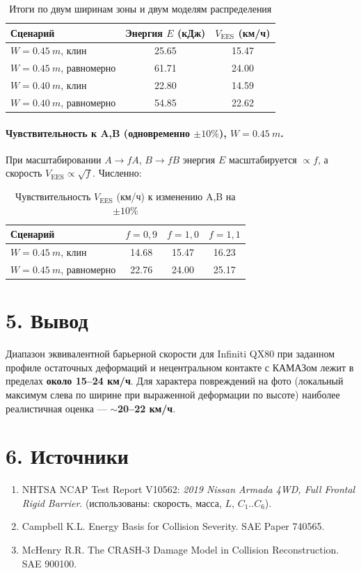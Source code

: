 \documentclass[12pt,a4paper]{article}
\begin{document}
	\begin{table}[h]
		\centering\small
		\caption{Итоги по двум ширинам зоны и двум моделям распределения}
		\begin{tabular}{lcc}
			\toprule
			Сценарий & Энергия $E$ (кДж) & $V_{\text{EES}}$ (км/ч)\\
			\midrule
			$W=\SI{0.45}{m}$, клин & 25.65 & 15.47\\
			$W=\SI{0.45}{m}$, равномерно & 61.71 & 24.00\\
			$W=\SI{0.40}{m}$, клин & 22.80 & 14.59\\
			$W=\SI{0.40}{m}$, равномерно & 54.85 & 22.62\\
			\bottomrule
		\end{tabular}
	\end{table}
	
	\paragraph{Чувствительность к A,B (одновременно $\pm10\%$), $W=\SI{0.45}{m}$.}
	При масштабировании $A\!\to\!fA$, $B\!\to\!fB$ энергия $E$ масштабируется $\propto f$, а скорость $V_{\text{EES}}\propto\sqrt{f}$. Численно:
	
	\begin{table}[h]
		\centering\small
		\caption{Чувствительность $V_{\text{EES}}$ (км/ч) к изменению A,B на $\pm10\%$}
		\begin{tabular}{lccc}
			\toprule
			Сценарий & $f=0{,}9$ & $f=1{,}0$ & $f=1{,}1$\\
			\midrule
			$W=\SI{0.45}{m}$, клин & 14.68 & 15.47 & 16.23\\
			$W=\SI{0.45}{m}$, равномерно & 22.76 & 24.00 & 25.17\\
			\bottomrule
		\end{tabular}
	\end{table}
	
	\section*{5. Вывод}
	Диапазон эквивалентной барьерной скорости для Infiniti QX80 при заданном профиле остаточных деформаций и нецентральном контакте с КАМАЗом лежит в пределах \textbf{около 15–24 км/ч}. Для характера повреждений на фото (локальный максимум слева по ширине при выраженной деформации по высоте) наиболее реалистичная оценка — \textbf{$\sim$20–22 км/ч}.
	
	\section*{6. Источники}
	\begin{enumerate}
		\item NHTSA NCAP Test Report V10562: \emph{2019 Nissan Armada 4WD, Full Frontal Rigid Barrier}. (использованы: скорость, масса, $L$, $C_1..C_6$).
		\item Campbell K.L. Energy Basis for Collision Severity. SAE Paper 740565.
		\item McHenry R.R. The CRASH-3 Damage Model in Collision Reconstruction. SAE 900100.
	\end{enumerate}
	
\end{document}
